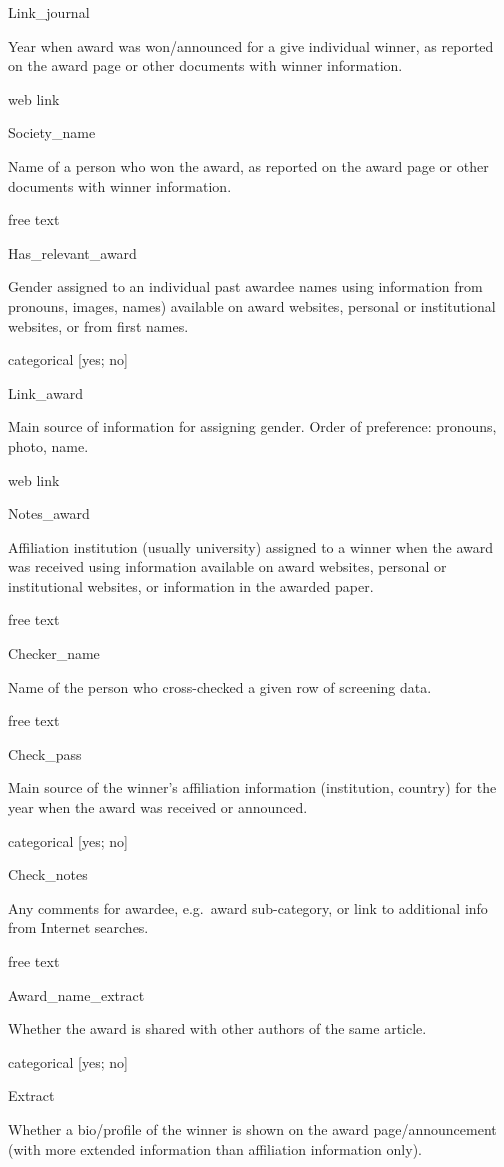 \documentclass[
]{article}
\begin{document}
Link\_journal

Year when award was won/announced for a give individual winner, as
reported on the award page or other documents with winner information.

web link

Society\_name

Name of a person who won the award, as reported on the award page or
other documents with winner information.

free text

Has\_relevant\_award

Gender assigned to an individual past awardee names using information
from pronouns, images, names) available on award websites, personal or
institutional websites, or from first names.

categorical {[}yes; no{]}

Link\_award

Main source of information for assigning gender. Order of preference:
pronouns, photo, name.

web link

Notes\_award

Affiliation institution (usually university) assigned to a winner when
the award was received using information available on award websites,
personal or institutional websites, or information in the awarded paper.

free text

Checker\_name

Name of the person who cross-checked a given row of screening data.

free text

Check\_pass

Main source of the winner's affiliation information (institution,
country) for the year when the award was received or announced.

categorical {[}yes; no{]}

Check\_notes

Any comments for awardee, e.g.~award sub-category, or link to additional
info from Internet searches.

free text

Award\_name\_extract

Whether the award is shared with other authors of the same article.

categorical {[}yes; no{]}

Extract

Whether a bio/profile of the winner is shown on the award
page/announcement (with more extended information than affiliation
information only).
\end{document}
